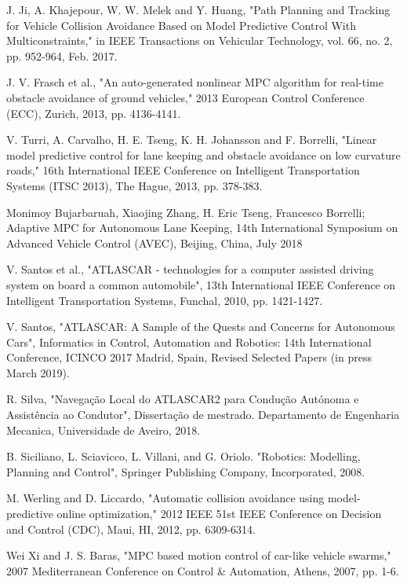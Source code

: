 \documentclass[conference,11pt]{IEEEtran}
\begin{document}
\begin{thebibliography}{00}
	J. Ji, A. Khajepour, W. W. Melek and Y. Huang, "Path Planning and Tracking for Vehicle Collision Avoidance Based on Model Predictive Control With Multiconstraints," in IEEE Transactions on Vehicular Technology, vol. 66, no. 2, pp. 952-964, Feb. 2017.
	
	J. V. Frasch et al., "An auto-generated nonlinear MPC algorithm for real-time obstacle avoidance of ground vehicles," 2013 European Control Conference (ECC), Zurich, 2013, pp. 4136-4141.
	
	V. Turri, A. Carvalho, H. E. Tseng, K. H. Johansson and F. Borrelli, "Linear model predictive control for lane keeping and obstacle avoidance on low curvature roads," 16th International IEEE Conference on Intelligent Transportation Systems (ITSC 2013), The Hague, 2013, pp. 378-383.	
	
	Monimoy Bujarbaruah, Xiaojing Zhang, H. Eric Tseng, Francesco Borrelli; Adaptive MPC for Autonomous Lane Keeping, 14th International Symposium on Advanced Vehicle Control (AVEC), Beijing, China, July 2018
		

	V. Santos et al., "ATLASCAR - technologies for a computer assisted driving system on board a common automobile", 13th International IEEE Conference on Intelligent Transportation Systems, Funchal, 2010, pp. 1421-1427.
		
	V. Santos, "ATLASCAR: A Sample of the Quests and Concerns for Autonomous Cars", Informatics in Control, Automation and Robotics: 14th International Conference, ICINCO 2017 Madrid, Spain, Revised Selected Papers (in press March 2019).
		
    R. Silva, "Navegação Local do ATLASCAR2 para Condução Autónoma e Assistência ao Condutor", Dissertação de mestrado. Departamento de Engenharia Mecanica, Universidade de Aveiro, 2018.
    
	B. Siciliano, L. Sciavicco, L. Villani, and G. Oriolo. "Robotics: Modelling, Planning and Control", Springer Publishing Company, Incorporated, 2008. 

	M. Werling and D. Liccardo, "Automatic collision avoidance using model-predictive online optimization," 2012 IEEE 51st IEEE Conference on Decision and Control (CDC), Maui, HI, 2012, pp. 6309-6314.
	
	Wei Xi and J. S. Baras, "MPC based motion control of car-like vehicle swarms," 2007 Mediterranean Conference on Control \& Automation, Athens, 2007, pp. 1-6.
	

\end{thebibliography}
\end{document}
